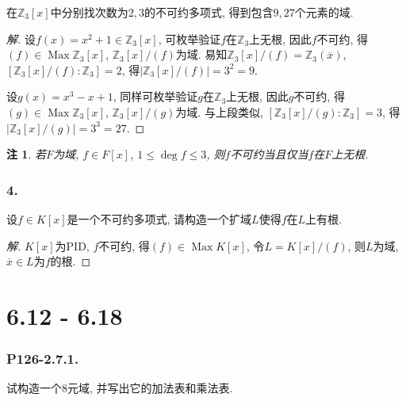 \documentclass[12pt, a4paper, fontset=windows]{ctexart}
\newcommand{\Z}{\mathbb{Z}}
\newcommand{\Max}{\operatorname{Max}}
\newcommand{\abs}[1]{\left|{#1}\right|}
\newcommand{\cl}[1]{\overline{#1}} %
\newtheorem*{remark}{注}
\newenvironment{solution}{\begin{proof}[解]}{\end{proof}}
\begin{document}
在$\Z_3[x]$中分别找次数为$2,3$的不可约多项式, 
得到包含$9,27$个元素的域. 

\begin{solution}
设$f(x)=x^2+1\in\Z_3[x]$, 可枚举验证$f$在$\Z_3$上无根, 
因此$f$不可约, 得$(f)\in\Max\Z_3[x]$, $\Z_3[x]/(f)$为域. 
易知$\Z_3[x]/(f)=\Z_3(\cl{x})$, $[\Z_3[x]/(f):\Z_3]=2$, 
得$\abs{\Z_3[x]/(f)}=3^2=9$. 

设$g(x)=x^3-x+1$, 同样可枚举验证$g$在$\Z_3$上无根, 
因此$g$不可约, 得$(g)\in\Max\Z_3[x]$, $\Z_3[x]/(g)$为域. 
与上段类似, $[\Z_3[x]/(g):\Z_3]=3$, 得$\abs{\Z_3[x]/(g)}=3^3=27$. 
\end{solution}

\begin{remark}
若$F$为域, $f\in F[x]$, $1\le\deg f\le 3$, 
则$f$不可约当且仅当$f$在$F$上无根. 
\end{remark}

\section*{4.}

设$f\in K[x]$是一个不可约多项式, 请构造一个扩域$L$使得$f$在$L$上有根. 

\begin{solution}
$K[x]$为PID, $f$不可约, 得$(f)\in\Max K[x]$, 
令$L=K[x]/(f)$, 则$L$为域, $\cl{x}\in L$为$f$的根. 
\end{solution}

\clearpage
\part{6.12 - 6.18}

\section*{P126-2.7.1.}

试构造一个$8$元域, 并写出它的加法表和乘法表. 
\end{document}
